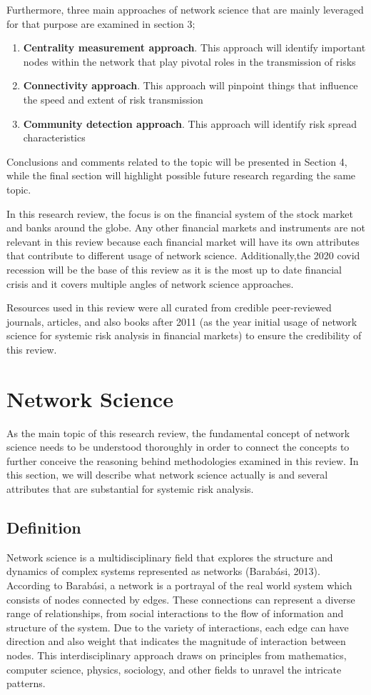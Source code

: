 \documentclass[a4paper,11pt]{article}
\begin{document}
Furthermore, three main approaches of network science that are mainly leveraged for that purpose are examined in section 3; 
\begin{enumerate}
        \item \textbf{Centrality measurement approach}. This approach will identify important nodes within the network that play pivotal roles in the transmission of risks
        \item \textbf{Connectivity approach}. This approach will pinpoint things that influence the speed and extent of risk transmission
        \item \textbf{Community detection approach}. This approach will identify risk spread characteristics
\end{enumerate}
Conclusions and comments related to the topic will be presented in Section 4, while the final section will highlight possible future research regarding the same topic.

In this research review, the focus is on the financial system of the stock market and banks around the globe. Any other financial markets and instruments are not relevant in this review because each financial market will have its own attributes that contribute to different usage of network science. Additionally,the 2020 covid recession will be the base of this review as it is the most up to date financial crisis and it covers multiple angles of network science approaches.

Resources used in this review were all curated from credible peer-reviewed journals, articles, and also books after 2011 (as the year initial usage of network science for systemic risk analysis in financial markets) to ensure the credibility of this review.

\section{Network Science}
As the main topic of this research review, the fundamental concept of network science needs to be understood thoroughly in order to connect the concepts to further conceive the reasoning behind methodologies examined in this review. In this section, we will describe what network science actually is and several attributes that are substantial for systemic risk analysis.

\subsection{Definition}
Network science is a multidisciplinary field that explores the structure and dynamics of complex systems represented as networks (Barabási, 2013). According to Barabási, a network is a portrayal of the real world system which consists of nodes connected by edges. These connections can represent a diverse range of relationships, from social interactions to the flow of information and structure of the system. Due to the variety of interactions, each edge can have direction and also weight that indicates the magnitude of interaction between nodes. This interdisciplinary approach draws on principles from mathematics, computer science, physics, sociology, and other fields to unravel the intricate patterns.
\end{document}
